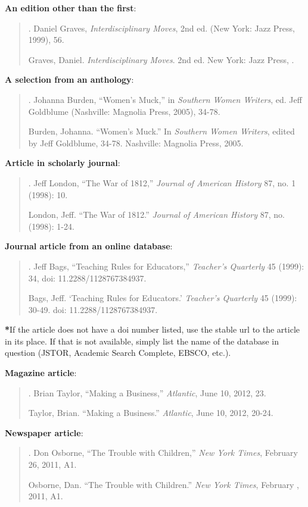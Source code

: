 \textbf{An edition other than the first}:

\begin{quote}
. Daniel Graves, \emph{Interdisciplinary Moves}, 2nd ed. (New York: Jazz Press, 1999), 56.

Graves, Daniel. \emph{Interdisciplinary Moves}. 2nd ed. New York: Jazz Press, .
\end{quote}

\textbf{A selection from an anthology}:
\begin{quote}

. Johanna Burden, ``Women's Muck,'' in \emph{Southern Women Writers}, ed. Jeff Goldblume (Nashville: Magnolia Press, 2005), 34-78.

Burden, Johanna. ``Women's Muck.'' In \emph{Southern Women Writers}, \tab edited by Jeff Goldblume, 
34-78. Nashville: Magnolia Press, 2005.
\end{quote}

\textbf{Article in scholarly journal}:
\begin{quote}
. Jeff London, ``The War of 1812,'' \emph{Journal of American History} 87, no. 1 (1998): 10.

London, Jeff. ``The War of 1812.'' \emph{Journal of American History} 87, no.  (1998): 1-24.
\end{quote}

\textbf{Journal article from an online database}:
\begin{quote}

. Jeff Bags, ``Teaching Rules for Educators,'' \emph{Teacher's Quarterly} 45 (1999): 34, doi: 11.2288/1128767384937.

Bags, Jeff. `Teaching Rules for Educators.' \emph{Teacher's Quarterly} 45 \tab (1999): 30-49. doi: 11.2288/1128767384937.
\end{quote}

\textbf{*}If the article does not have a doi number listed, use the stable url to the article in its place. If that is not available, simply list the name of the database in question (JSTOR, Academic Search Complete, EBSCO, etc.).


\textbf{Magazine article}:
\begin{quote}
. Brian Taylor, ``Making a Business,'' \emph{Atlantic}, June 10, 2012, 23.

Taylor, Brian. ``Making a Business.'' \emph{Atlantic}, June 10, 2012, 20-24.
\end{quote}


\textbf{Newspaper article}:
\begin{quote}
. Don Osborne, ``The Trouble with Children,'' \emph{New York Times}, February 26, 2011, A1.

Osborne, Dan. ``The Trouble with Children.'' \emph{New York Times}, February , 2011, A1.
\end{quote}
